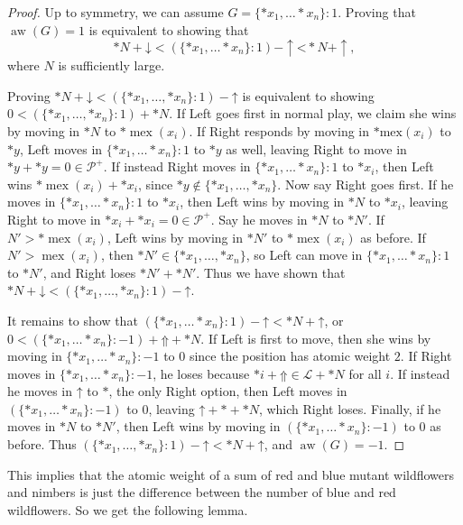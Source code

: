 \documentclass{amsart}
\theoremstyle{plain}
\theoremstyle{definition}
\theoremstyle{remark}
\numberwithin{equation}{section}
\numberwithin{thm}{section}
\DeclareMathOperator{\aw}{aw}
\DeclareMathOperator{\mex}{mex}
\begin{document}
\begin{proof}
 Up to symmetry, we can assume $G = \{*x_1,\ldots *x_n\}:1$. Proving that $\aw(G) = 1$ is equivalent to showing that \begin{equation}
     *N + \mathord{\downarrow}  < (\{*x_1,\ldots *x_n\}:1 )- \uparrow \mathord  <*N +  \uparrow,
 \end{equation}where $N$ is sufficiently large. 
 
 Proving $*N + \mathord{\downarrow} < (\{*x_1,\dots,*x_n\}:1) -\mathord{\uparrow}$ is equivalent to showing $0 <( \{*x_1,\dots,*x_n\}:1)+*N$. If Left goes first in normal play, we claim she wins by moving in $*N$ to $*\mex ({x_i})$. If Right responds by moving in $*\text{mex} ({x_i})$ to $*y $, Left moves in $\{*x_1,\ldots *x_n\}:1$ to $*y$ as well, leaving Right to move in $*y+*y  = 0\in \mathcal{P}^+$. If instead Right moves in $\{*x_1,\ldots *x_n\}:1$ to $*x_i$, then Left wins $*\mex (x_i) + *x_i $, since $*y \notin \{*x_1,\dots,*x_n\}$. Now say Right goes first. If he moves in $\{*x_1,\ldots *x_n\}:1$ to $*x_i$, then Left wins by moving in $*N$ to $*x_i$, leaving Right to move in $*x_i + *x_i = 0 \in \mathcal{P}^+$. Say he moves in $*N$ to $*N'$. If $N' > *\mex(x_i) $, Left wins by moving in $*N'$ to $*\mex(x_i)$ as before. If $N' > \mex (x_i)$, then $*N' \in \{*x_1 ,\dots,*x_n \}$, so Left can move in $\{*x_1,\ldots *x_n\}:1$ to $*N'$, and Right loses $*N' + *N'$.
Thus we have shown that $*N + \mathord{\downarrow} < (\{*x_1,\dots,*x_n\}:1) - \mathord{\uparrow}$.

It remains to show that $ (\{*x_1,\ldots *x_n\}:1 )- \mathord{\uparrow} <*N + \mathord{\uparrow}$, or $0<(\{*x_1,\ldots *x_n\}:-1 ) + \mathord{\Uparrow} +*N$. If Left is first to move, then she wins by moving in $\{*x_1,\ldots *x_n\}:-1 $ to $0$ since the position has atomic weight $2$. If Right moves in $\{*x_1,\ldots *x_n\}:-1$, he loses because $*i + \mathord{\Uparrow} \in \mathcal{L} + *N $ for all $i$. If instead he moves in $\mathord{\uparrow}$ to $*$, the only Right option, then Left moves in $(\{*x_1,\ldots *x_n\}:-1 )$ to $0$, leaving $\mathord{\uparrow} + *+ *N $, which Right loses.  Finally, if he moves in $*N$ to $*N'$, then Left wins by moving in $(\{*x_1,\ldots *x_n\}:-1 )$ to $0$ as before. Thus $(\{*x_1,\dots,*x_n\}:1) - \mathord{\uparrow} < *N + \mathord{\uparrow}$, and $\aw(G) = -1$.
\end{proof}
This implies that the atomic weight of a sum of red and blue mutant wildflowers and nimbers is just the difference between the number of blue and red wildflowers. So we get the following lemma.
\end{document}
